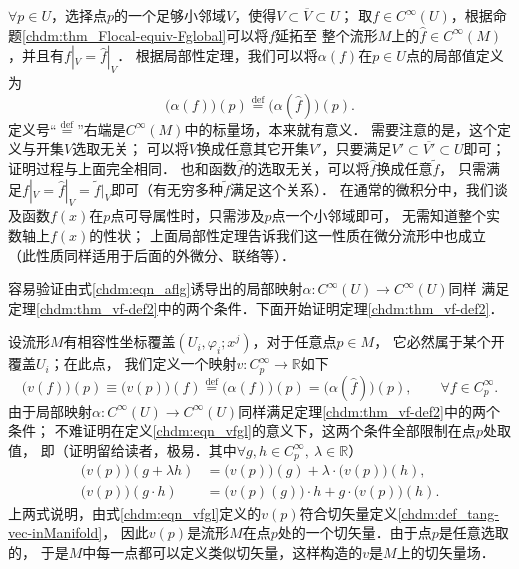 $\forall p\in U$，选择点$p$的一个足够小邻域$V$，使得$V\subset \overline{V} \subset U$；
取$f\in C^\infty(U)$，根据命题\ref{chdm:thm_Flocal-equiv-Fglobal}可以将$f$延拓至
整个流形$M$上的$\hat{f}\in C^\infty(M)$，并且有$f|_V= \hat{f}|_V$．
根据局部性定理，我们可以将$\alpha(f)$在$p\in U$点的局部值定义为
\begin{equation}\label{chdm:eqn_aflg}
    \bigl(\alpha(f)\bigr)(p) \overset{\mathrm {def}}{=} \bigl(\alpha(\hat{f})\bigr)(p) .
\end{equation}
定义号“$\overset{\mathrm {def}}{=}$”右端是$C^\infty(M)$中的标量场，本来就有意义．
需要注意的是，这个定义与开集$V$选取无关；
可以将$V$换成任意其它开集$V'$，只要满足$V' \subset \overline{V'} \subset U$即可；
证明过程与上面完全相同．
也和函数$\hat{f}$的选取无关，可以将$\hat{f}$换成任意$\tilde{f}$，
只需满足$f|_V=\hat{f}|_V=\tilde{f}|_V$即可（有无穷多种$\tilde{f}$满足这个关系）．
在通常的微积分中，我们谈及函数$f(x)$在$p$点可导属性时，只需涉及$p$点一个小邻域即可，
无需知道整个实数轴上$f(x)$的性状；
上面局部性定理告诉我们这一性质在微分流形中也成立
（此性质同样适用于后面的外微分、联络等）．

容易验证由式\eqref{chdm:eqn_aflg}诱导出的局部映射$\alpha:C^\infty(U)\to C^\infty(U)$同样
满足定理\ref{chdm:thm_vf-def2}中的两个条件．下面开始证明定理\ref{chdm:thm_vf-def2}．

设流形$M$有相容性坐标覆盖$(U_i,\varphi_i;x^j)$，对于任意点$p\in M$，
它必然属于某个开覆盖$U_i$；在此点，
我们定义一个映射$v:C^\infty_p \to \mathbb{R}$如下
\begin{equation}\label{chdm:eqn_vfgl}
    \bigl(v(f)\bigr)(p) \equiv \bigl(v(p)\bigr)(f) \overset{\mathrm {def}}{=} 
      \bigl(\alpha({f})\bigr)(p) =\bigl(\alpha(\hat{f})\bigr)(p) , \qquad \forall f\in C^\infty_p .
\end{equation}
由于局部映射$\alpha:C^\infty(U)\to C^\infty(U)$同样满足定理\ref{chdm:thm_vf-def2}中的两个条件；
不难证明在定义\eqref{chdm:eqn_vfgl}的意义下，这两个条件全部限制在点$p$处取值，
即（证明留给读者，极易．其中$\forall g,h \in C^\infty_p,\ \lambda \in \mathbb{R} $）
\begin{subequations}\label{chdm:eqn_tmpvfg}
\begin{align}
    \bigl(v(p)\bigr) (g+\lambda h) &= \bigl(v(p)\bigr) (g) + \lambda\cdot \bigl(v(p)\bigr) (h) , \\
    \bigl(v(p)\bigr) (g\cdot h) &= \bigl(v(p)(g)\bigr) \cdot h + g\cdot\bigl(v(p)\bigr) ( h) .
\end{align}
\end{subequations}
上两式说明，由式\eqref{chdm:eqn_vfgl}定义的$v(p)$符合切矢量定义\ref{chdm:def_tang-vec-inManifold}，
因此$v(p)$是流形$M$在点$p$处的一个切矢量．由于点$p$是任意选取的，
于是$M$中每一点都可以定义类似切矢量，这样构造的$v$是$M$上的{\kaishu 切矢量场}．


